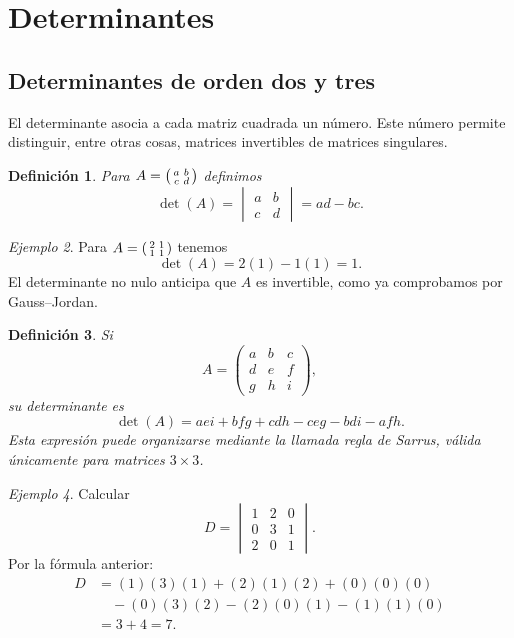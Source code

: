 \documentclass[12pt]{article}
\newtheorem{definicion}{Definición}[section]
\theoremstyle{remark}
\newtheorem{ejemplo}[definicion]{Ejemplo}
\begin{document}
\section{Determinantes}
\subsection*{Determinantes de orden dos y tres}
El determinante asocia a cada matriz cuadrada un número. Este número permite distinguir, entre otras cosas, matrices invertibles de matrices singulares.

\begin{definicion}
Para $A=\begin{psmallmatrix}a&b\\c&d\end{psmallmatrix}$ definimos
\[
\det(A)=\begin{vmatrix}a&b\\c&d\end{vmatrix}=ad-bc.
\]
\end{definicion}
\begin{ejemplo}
Para $A=\begin{psmallmatrix}2&1\\1&1\end{psmallmatrix}$ tenemos
\[
\det(A)=2(1)-1(1)=1.
\]
El determinante no nulo anticipa que $A$ es invertible, como ya comprobamos por Gauss--Jordan.
\end{ejemplo}

\begin{definicion}
Si
\[
A=\begin{pmatrix}a&b&c\\d&e&f\\g&h&i\end{pmatrix},
\]
su determinante es
\[
\boxed{\det(A)=aei+bfg+cdh-ceg-bdi-afh.}
\]
Esta expresión puede organizarse mediante la llamada \emph{regla de Sarrus}, válida únicamente para matrices $3\times3$.
\end{definicion}

\begin{ejemplo}
Calcular
\[
D=\begin{vmatrix}1&2&0\\0&3&1\\2&0&1\end{vmatrix}.
\]
Por la fórmula anterior:
\begin{align*}
D&=(1)(3)(1)+(2)(1)(2)+(0)(0)(0)\\
&\quad -(0)(3)(2)-(2)(0)(1)-(1)(1)(0)\\
&=3+4=\boxed{7}.
\end{align*}
\end{ejemplo}
\end{document}
